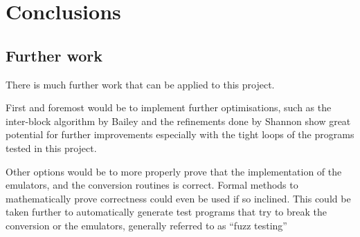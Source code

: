 \chapter{Conclusions}\label{ch:conclusions}
\section{Further work}\label{sec:furtherwork}
There is much further work that can be applied to this project.

First and foremost would be to implement further optimisations, such as the
inter-block algorithm by Bailey and the refinements done by Shannon show great
potential for further improvements especially with the tight loops of the
programs tested in this project.

Other options would be to more properly prove that the implementation of the
emulators, and the conversion routines is correct. Formal methods to
mathematically prove correctness could even be used if so inclined. This could
be taken further to automatically generate test programs that try to break the
conversion or the emulators, generally referred to as ``fuzz testing''

